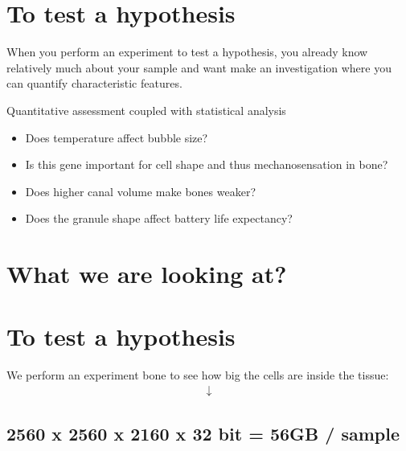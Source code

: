 \documentclass[letterpaper,10pt,english]{sphinxmanual}
\begin{document}
\section{To test a hypothesis}
\label{\detokenize{04-BasicSegmentation:to-test-a-hypothesis}}
\sphinxAtStartPar
When you perform an experiment to test a hypothesis, you already know relatively much about your sample and want make an investigation where you can quantify characteristic features.

\sphinxAtStartPar
Quantitative assessment coupled with statistical analysis
\begin{itemize}
\item {} 
\sphinxAtStartPar
Does temperature affect bubble size?

\item {} 
\sphinxAtStartPar
Is this gene important for cell shape and thus mechanosensation in bone?

\item {} 
\sphinxAtStartPar
Does higher canal volume make bones weaker?

\item {} 
\sphinxAtStartPar
Does the granule shape affect battery life expectancy?

\end{itemize}


\section{What we are looking at?}
\label{\detokenize{04-BasicSegmentation:what-we-are-looking-at}}



\section{To test a hypothesis}
\label{\detokenize{04-BasicSegmentation:id1}}
\sphinxAtStartPar
We perform an experiment bone to see how big the cells are inside the tissue:
\begin{equation*}
\begin{split}\downarrow\end{split}
\end{equation*}



\subsection{2560 x 2560 x 2160 x 32 bit = 56GB / sample}
\label{\detokenize{04-BasicSegmentation:center-2560-x-2560-x-2160-x-32-bit-56gb-sample-center}}
\end{document}
